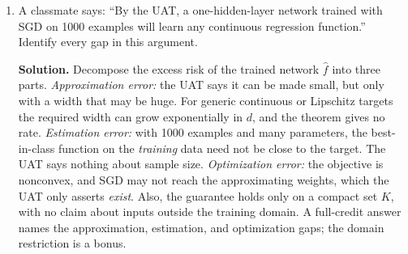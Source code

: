 \documentclass[11pt]{article}
\begin{document}
\begin{enumerate}[label=\textbf{1.2-E\arabic*}, leftmargin=*]
  \item A classmate says: ``By the UAT, a one-hidden-layer network trained with SGD on 1000 examples will learn any continuous regression function.'' Identify every gap in this argument.

  \textbf{Solution.} Decompose the excess risk of the trained network $\hat f$ into three parts. \emph{Approximation error:} the UAT says it can be made small, but only with a width that may be huge. For generic continuous or Lipschitz targets the required width can grow exponentially in $d$, and the theorem gives no rate. \emph{Estimation error:} with 1000 examples and many parameters, the best-in-class function on the \emph{training} data need not be close to the target. The UAT says nothing about sample size. \emph{Optimization error:} the objective is nonconvex, and SGD may not reach the approximating weights, which the UAT only asserts \emph{exist}. Also, the guarantee holds only on a compact set $K$, with no claim about inputs outside the training domain. A full-credit answer names the approximation, estimation, and optimization gaps; the domain restriction is a bonus.
\end{enumerate}
\end{document}
